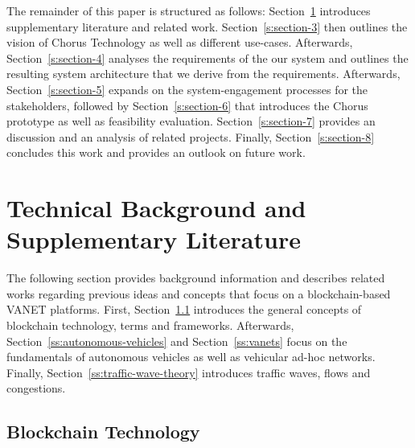 \documentclass{llncs}
\begin{document}
{		The remainder of this paper is structured as follows: Section~\ref{s:section-2} introduces supplementary literature and related work. Section~\ref{s:section-3} then outlines the vision of Chorus Technology as well as different use-cases. Afterwards, Section~\ref{s:section-4} analyses the requirements of the our system and outlines the resulting system architecture that we derive from the requirements. Afterwards, Section~\ref{s:section-5} expands on the system-engagement processes for the stakeholders, followed by Section~\ref{s:section-6} that introduces the Chorus prototype as well as feasibility evaluation. Section~\ref{s:section-7} provides an discussion and an analysis of related projects. Finally, Section~\ref{s:section-8} concludes this work and provides an outlook on future work.



	\section{Technical Background and Supplementary Literature}	
		\label{s:section-2}
		
		The following section provides background information and describes related works regarding previous ideas and concepts that focus on a blockchain-based VANET platforms. First, Section~\ref{ss:blockchain-intro} introduces the general concepts of blockchain technology, terms and frameworks. Afterwards, Section~\ref{ss:autonomous-vehicles} and Section~\ref{ss:vanets} focus on the fundamentals of autonomous vehicles as well as vehicular ad-hoc networks. Finally, Section~\ref{ss:traffic-wave-theory} introduces traffic waves, flows and congestions. 
					
		
		\subsection{Blockchain Technology}
			\label{ss:blockchain-intro}
			
}
\end{document}
